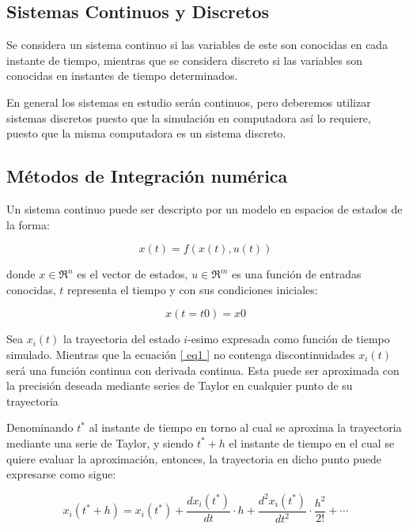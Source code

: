 \documentclass[a4paper,	11pt]{report}
\begin{document}
\subsection{Sistemas Continuos y Discretos}
Se considera un sistema continuo si las variables de este son conocidas en cada instante de tiempo, mientras que se considera discreto si las variables son conocidas en instantes de tiempo determinados.

En general los sistemas en estudio serán continuos, pero deberemos utilizar sistemas discretos puesto que la simulación en computadora así lo requiere, puesto que la misma computadora es un sistema discreto.

\subsection{Métodos de Integración numérica}

Un sistema continuo puede ser descripto por un modelo en espacios de estados de la forma:

\begin{equation} \label{eq1}
x(t) = f (x(t), u(t))
\end{equation}

donde $x \in \Re^n$  es el vector de estados, $u \in \Re^m$ es una función de entradas conocidas,
$t$ representa el tiempo y con sus condiciones iniciales:

\begin{equation} \label{eq2}
x(t = t 0 ) = x 0
\end{equation}

Sea $x_i (t)$ la trayectoria del estado $i$-esimo expresada como función de tiempo simulado. 
Mientras que la ecuación \eqref{ eq1 } no contenga discontinuidades $x_i (t)$ será una función continua con derivada continua. Esta puede ser aproximada con la precisión deseada mediante series de Taylor en cualquier punto de su trayectoria

Denominando $t^{\ast}$ al instante de tiempo en torno al cual se aproxima la trayectoria mediante una serie de Taylor, y siendo $t^{\ast} + h$ el instante de tiempo en el cual se quiere evaluar la aproximación, entonces, la trayectoria en dicho punto puede expresarse como sigue:

\begin{equation} \label{eq3}
x_i(t^* + h) = x_i(t^*) + \frac{dx_i (t^*)}{dt} \cdot h + \frac{d^{2}x_i (t^*)}{dt^2} \cdot \frac{h^2}{2!} + \cdots
\end{equation}
\end{document}
